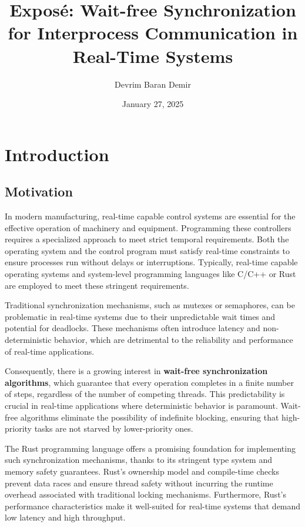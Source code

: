 \documentclass[ a4paper,
                toc=bibliography
              ]{scrartcl}
\author{Devrim Baran Demir}
\title{Exposé: Wait-free Synchronization for Interprocess Communication in Real-Time Systems}
\date{January 27, 2025}
\begin{document}
\maketitle

\section{Introduction}
\subsection{Motivation}

In modern manufacturing, real-time capable control systems are essential for the effective operation of machinery and equipment. Programming these controllers requires a specialized approach to meet strict temporal requirements. Both the operating system and the control program must satisfy real-time constraints to ensure processes run without delays or interruptions. Typically, real-time capable operating systems and system-level programming languages like C/C++ or Rust are employed to meet these stringent requirements.

Traditional synchronization mechanisms, such as mutexes or semaphores, can be problematic in real-time systems due to their unpredictable wait times and potential for deadlocks. These mechanisms often introduce latency and non-deterministic behavior, which are detrimental to the reliability and performance of real-time applications. \cite{herlihy1991wait, brandenburg2019multiprocessorrealtimelockingprotocols, kode2024analysisSynchronization}

Consequently, there is a growing interest in \textbf{wait-free synchronization algorithms}, which guarantee that every operation completes in a finite number of steps, regardless of the number of competing threads. This predictability is crucial in real-time applications where deterministic behavior is paramount. Wait-free algorithms eliminate the possibility of indefinite blocking, ensuring that high-priority tasks are not starved by lower-priority ones. \cite{kogan2012methodology, herlihy1991wait}

The Rust programming language offers a promising foundation for implementing such synchronization mechanisms, thanks to its stringent type system and memory safety guarantees. Rust's ownership model and compile-time checks prevent data races and ensure thread safety without incurring the runtime overhead associated with traditional locking mechanisms. Furthermore, Rust's performance characteristics make it well-suited for real-time systems that demand low latency and high throughput. \cite{xu2023rust,sharma2024rustembeddedsystemscurrent} 
\end{document}
